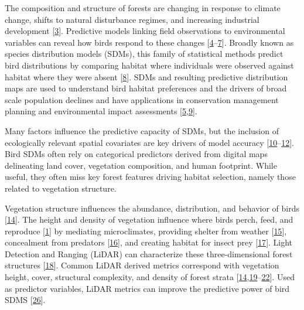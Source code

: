 \documentclass[manuscript, 3p, authoryear]{elsarticle} %
\begin{document}
The composition and structure of forests are changing in response to climate change, shifts to natural disturbance regimes, and increasing industrial development {[}\protect\hyperlink{ref-Brandt2013}{3}{]}. Predictive models linking field observations to environmental variables can reveal how birds respond to these changes {[}\protect\hyperlink{ref-Carrillo-Rubio2014}{4}--\protect\hyperlink{ref-He2015}{7}{]}. Broadly known as species distribution models (SDMs), this family of statistical methods predict bird distributions by comparing habitat where individuals were observed against habitat where they were absent {[}\protect\hyperlink{ref-Guisan2005}{8}{]}. SDMs and resulting predictive distribution maps are used to understand bird habitat preferences and the drivers of broad scale population declines and have applications in conservation management planning and environmental impact assessments {[}\protect\hyperlink{ref-englerAvianSDMsCurrent2017}{5},\protect\hyperlink{ref-franklinMappingSpeciesDistributions2010}{9}{]}.

Many factors influence the predictive capacity of SDMs, but the inclusion of ecologically relevant spatial covariates are key drivers of model accuracy {[}\protect\hyperlink{ref-Franklin1995}{10}--\protect\hyperlink{ref-fourcadePaintingsPredictDistribution2018}{12}{]}. Bird SDMs often rely on categorical predictors derived from digital maps delineating land cover, vegetation composition, and human footprint. While useful, they often miss key forest features driving habitat selection, namely those related to vegetation structure.

Vegetation structure influences the abundance, distribution, and behavior of birds {[}\protect\hyperlink{ref-Davies2014a}{14}{]}. The height and density of vegetation influence where birds perch, feed, and reproduce {[}\protect\hyperlink{ref-Bradbury2005}{1}{]} by mediating microclimates, providing shelter from weather {[}\protect\hyperlink{ref-CarrascalDiaz2006}{15}{]}, concealment from predators {[}\protect\hyperlink{ref-GotmarkBlomqvist1995}{16}{]}, and creating habitat for insect prey {[}\protect\hyperlink{ref-halajImportanceHabitatStructure2000}{17}{]}. Light Detection and Ranging (LiDAR) can characterize these three-dimensional forest structures {[}\protect\hyperlink{ref-limLiDARRemoteSensing2003}{18}{]}. Common LiDAR derived metrics correspond with vegetation height, cover, structural complexity, and density of forest strata {[}\protect\hyperlink{ref-Davies2014a}{14},\protect\hyperlink{ref-Lefsky2002}{19}--\protect\hyperlink{ref-Renner2018}{22}{]}. Used as predictor variables, LiDAR metrics can improve the predictive power of bird SDMS {[}\protect\hyperlink{ref-Bae2014}{26}{]}.
\end{document}
